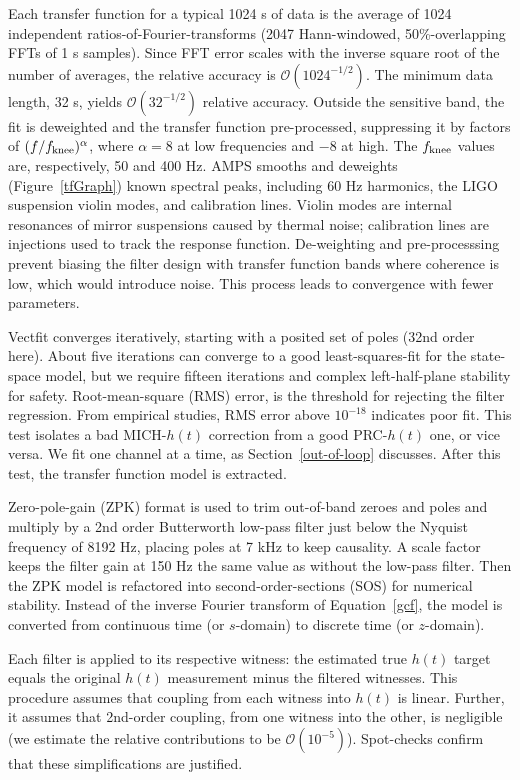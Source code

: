 Each transfer function for a typical 1024 s of data is the average of 1024 independent ratios-of-Fourier-transforms (2047 Hann-windowed, 50\%-overlapping FFTs of 1 s samples). Since FFT error scales with the inverse square root of the number of averages, the relative accuracy is $\mathcal{O}\left(1024^{-1/2}\right)$. The minimum data length, 32 s, yields $\mathcal{O}\left(32^{-1/2}\right)$ relative accuracy. Outside the sensitive band, the fit is deweighted and the transfer function pre-processed, suppressing it by factors of $(f/f_\textup{knee})^\alpha$, where $\alpha = 8$ at low frequencies and $-8$ at high. The $f_\textup{knee}$ values are, respectively, 50 and 400 Hz. AMPS smooths and deweights (Figure~\ref{tfGraph}) known spectral peaks, including 60 Hz harmonics, the LIGO suspension violin modes, and calibration lines. Violin modes are internal resonances of mirror suspensions caused by thermal noise; calibration lines are injections used to track the response function. De-weighting and pre-processsing prevent biasing the filter design with transfer function bands where coherence is low, which would introduce noise. This process leads to convergence with fewer parameters.

 Vectfit converges iteratively, starting with a posited set of poles (32nd order here). 
About five iterations can converge to a good least-squares-fit for the state-space model, but we require fifteen iterations and complex left-half-plane stability for safety. Root-mean-square (RMS) error, is the threshold for rejecting the filter regression. 
From empirical studies, RMS error above $10^{-18}$ indicates poor fit. 
This test isolates a bad MICH-$h(t)$ correction from a good PRC-$h(t)$ one, or vice versa. 
	We fit one channel at a time, as Section~\ref{out-of-loop} discusses. After this test, the transfer function model is extracted. 

Zero-pole-gain (ZPK) format is used to trim out-of-band zeroes and poles and multiply by a 2nd order Butterworth low-pass filter just below the Nyquist frequency of 8192 Hz, placing poles at 7 kHz to keep causality. A scale factor keeps the filter gain at 150 Hz the same value as without the low-pass filter. Then the ZPK model is refactored into second-order-sections (SOS) for numerical stability. Instead of the inverse Fourier transform of Equation~\ref{gcf}, the model is converted from continuous time (or $s$-domain) to discrete time (or $z$-domain). 

Each filter is applied to its respective witness: the estimated true $h(t)$ target equals the original $h(t)$ measurement minus the filtered witnesses. 
This procedure assumes that coupling from each witness into $h(t)$ is linear. Further, it assumes that 2nd-order coupling, from one witness into the other, is negligible (we estimate the relative contributions to be $\mathcal{O}(10^{-5})$). Spot-checks confirm that these simplifications are justified.  

